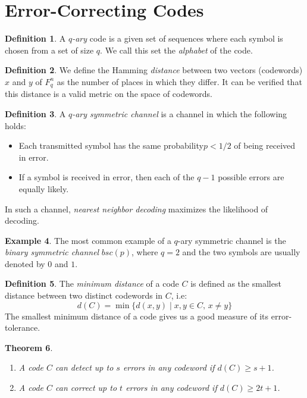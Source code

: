 \documentclass[11pt,a4paper]{article}
\theoremstyle{definition}
\newtheorem{definition}{Definition}[section]
\newtheorem{example}[definition]{Example}
\theoremstyle{plain}
\newtheorem{theorem}[definition]{Theorem}
\theoremstyle{remark}
\begin{document}
\section{Error-Correcting Codes}

\begin{definition}
    A \emph{$q$-ary} code is a given set of sequences where each symbol is chosen from a set of size $q$. 
    We call this set the \emph{alphabet} of the code.
\end{definition}

\begin{definition}
    We define the Hamming \emph{distance} between two vectors (codewords) $x$ and $y$ of $F^n_q$ as the number of places in which they differ. 
    It can be verified that this distance is a valid metric on the space of codewords. 
\end{definition}

\begin{definition}
    A \emph{$q$-ary symmetric channel} is a channel in which the following holds: 
    \begin{itemize}
        \item  Each transmitted symbol has the same probability$p < 1/2$ of being received in error. 
        \item If a symbol is received in error, then each of the $q - 1$ possible errors are equally likely.
    \end{itemize}

    In such a channel, \emph{nearest neighbor decoding} maximizes the likelihood of decoding.
\end{definition}

\begin{example}
    The most common example of a $q$-ary symmetric channel is the \emph{binary symmetric channel} $bsc(p)$, where $q = 2$ and the two symbols are usually denoted by $0$ and $1$.
\end{example}

\begin{definition}
    The \emph{minimum distance} of a code $C$ is defined as the smallest distance between two distinct codewords in $C$, i.e: 
    $$d(C) = \min \{d(x, y) \mid x, y \in C, \, x \neq y\}$$
    The smallest minimum distance of a code gives us a good measure of its error-tolerance. 
\end{definition}

\begin{theorem} \label{thm:detect-correct}
    \begin{enumerate}[label = (\roman*)]
        \item A code $C$ can detect up to $s$ errors in any codeword if $d(C) \geq s + 1$. 
        \item A code $C$ can correct up to $t$ errors in any codeword if $d(C) \geq 2t + 1$.
    \end{enumerate}
\end{theorem}
\end{document}
